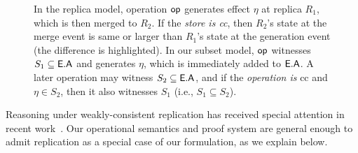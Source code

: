 \begin{figure}
{}
\hspace*{0.1in}
 \caption{\small In the replica model, operation $\textsf{op}$ generates effect
$\eta$ at replica $R_1$, which is then merged to $R_2$. If the
\emph{store is {\sc cc}}, then $R_2$'s state at the merge event is same or
larger than $R_1$'s state at the generation event (the difference is
highlighted). In our subset model, $\textsf{op}$ witnesses $S_1 \subseteq
\textsf{E}.\textsf{A}$ and generates $\eta$, which is immediately added to $\textsf{E}.\textsf{A}$. A
later operation may witness $S_2 \subseteq \textsf{E}.\textsf{A}$, and if the
\emph{operation is} {\sc cc} and $\eta \in S_2$, then it also
witnesses $S_1$ (i.e., $S_1 \subseteq S_2$). } 
\label{fig:ec-theirs-vs-ours}
\end{figure}

Reasoning under weakly-consistent replication has received special
attention in recent work~\cite{gotsmanpopl16}. Our operational
semantics and proof system are general enough to admit replication as
a special case of our formulation, as we explain below. 

